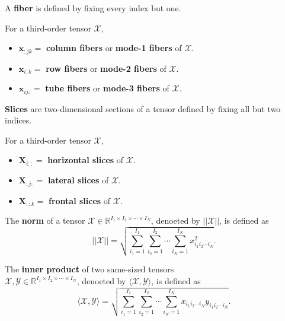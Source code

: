 \documentclass[final]{elsarticle}
\begin{document}
\begin{defn}
    A \textbf{fiber} is defined by fixing every index but one.
\end{defn}
For a third-order tensor $\boldsymbol{\mathscr{X}}$,
\begin{itemize}
    \item $\mathbf{x}_{:jk}=$ \textbf{column fibers} or \textbf{mode-1 fibers}  of $\boldsymbol{\mathscr{X}}$.
    \item $\mathbf{x}_{i:k}=$ \textbf{row fibers} or \textbf{mode-2 fibers}  of $\boldsymbol{\mathscr{X}}$.
    \item $\mathbf{x}_{ij:}=$ \textbf{tube fibers} or \textbf{mode-3 fibers}  of $\boldsymbol{\mathscr{X}}$.
\end{itemize}
\begin{defn}
    \textbf{Slices} are two-dimensional sections of a tensor defined by fixing all but two indices.
\end{defn}
For a third-order tensor $\boldsymbol{\mathscr{X}}$,
\begin{itemize}
    \item $\mathbf{X}_{i::}=$ \textbf{horizontal slices} of $\boldsymbol{\mathscr{X}}$.
    \item $\mathbf{X}_{:j:}=$ \textbf{lateral slices} of $\boldsymbol{\mathscr{X}}$.
    \item $\mathbf{X}_{::k}=$ \textbf{frontal slices} of $\boldsymbol{\mathscr{X}}$.
\end{itemize}
\begin{defn}
    The \textbf{norm} of a tensor $\boldsymbol{\mathscr{X}}\in\mathbb{R}^{I_1\times I_2\times\cdots\times I_N}$,
    denoeted by $||\boldsymbol{\mathscr{X}}||$, is defined as
    \begin{equation}
        ||\boldsymbol{\mathscr{X}}||=\sqrt{\sum_{i_1=1}^{I_1}\sum_{i_2=1}^{I_2}\cdots\sum_{i_N=1}^{I_N}x_{i_1i_2\cdots i_N}^2}.
    \end{equation}
\end{defn}
\begin{defn}
    The \textbf{inner product} of two same-sized tensors\\
    $\boldsymbol{\mathscr{X}},\boldsymbol{\mathscr{Y}}\in\mathbb{R}^{I_1\times I_2\times\cdots\times I_N}$,
    denoeted by $\langle\boldsymbol{\mathscr{X}},\boldsymbol{\mathscr{Y}}\rangle$, is defined as
    \begin{equation}
        \langle\boldsymbol{\mathscr{X}},\boldsymbol{\mathscr{Y}}\rangle=\sqrt{\sum_{i_1=1}^{I_1}\sum_{i_2=1}^{I_2}\cdots\sum_{i_N=1}^{I_N}x_{i_1i_2\cdots i_N}y_{i_1i_2\cdots i_N}}.
    \end{equation}
\end{defn}
\end{document}
